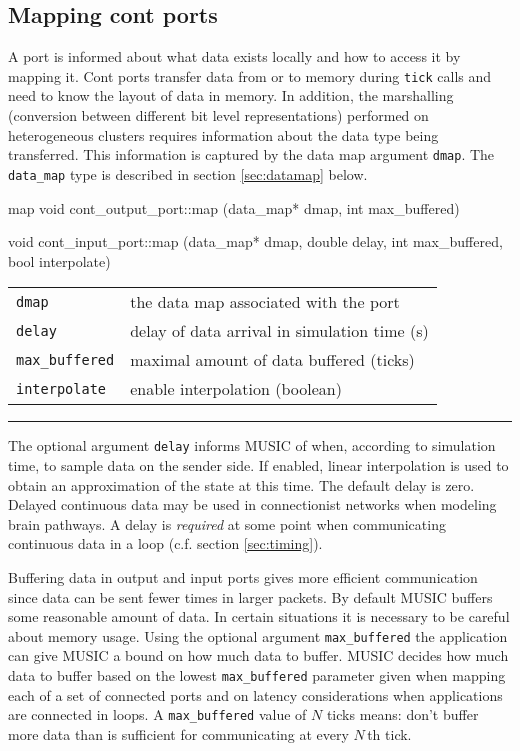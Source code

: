 \documentclass[a4paper,twoside]{report}
\makeatletter
\newenvironment{parameters}%
{\begin{tabular}{@{\hspace{2em}}lp{0.6\textwidth}}}%
{\end{tabular}\par\vspace{1mm}\par\hrule\par\vspace{5mm}}
\makeatother
\begin{document}
\subsection{Mapping cont ports}

A port is informed about what data exists locally and how to access it
by mapping it.  Cont ports transfer data from or to memory during
\lstinline|tick| calls and need to know the layout of data in memory.
In addition, the marshalling (conversion between different bit level
representations) performed on heterogeneous clusters requires
information about the data type being transferred.  This information
is captured by the data map argument \lstinline|dmap|.  The
\lstinline|data_map| type is described in section \ref{sec:datamap}
below.


\begin{head}{map}
  void cont_output_port::map (data_map* dmap,
                              int max_buffered)

  void cont_input_port::map (data_map* dmap,
                             double delay,
                             int max_buffered,
                             bool interpolate)
\end{head}
\begin{parameters}
  \lstinline|dmap| & the data map associated with the port \\
  \lstinline|delay| & delay of data arrival in simulation time (s) \\
  \lstinline|max_buffered| & maximal amount of data buffered (ticks)
  \\
  \lstinline|interpolate| & enable interpolation (boolean) \\
\end{parameters}

The optional argument \lstinline|delay| informs MUSIC of when,
according to simulation time, to sample data on the sender side.  If
enabled, linear interpolation is used to obtain an approximation of
the state at this time.  The default delay is zero.  Delayed continuous
data may be used in connectionist networks when modeling brain
pathways.  A delay is \emph{required} at some point when communicating
continuous data in a loop (c.f. section \ref{sec:timing}).

Buffering data in output and input ports gives more efficient
communication since data can be sent fewer times in larger packets.
By default MUSIC buffers some reasonable amount of data.  In certain
situations it is necessary to be careful about memory usage.  Using
the optional argument \lstinline|max_buffered| the application can
give MUSIC a bound on how much data to buffer.  MUSIC decides how much
data to buffer based on the lowest \lstinline|max_buffered| parameter
given when mapping each of a set of connected ports and on latency
considerations when applications are connected in loops.  A
\lstinline|max_buffered| value of \(N\) ticks means: don't buffer more
data than is sufficient for communicating at every \(N\)\,th tick.
\end{document}
